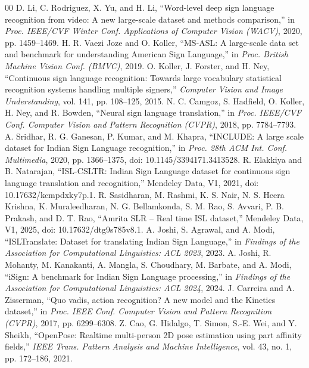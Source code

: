 \documentclass[conference]{IEEEtran}
\begin{document}
\begin{thebibliography}{00}
 D. Li, C. Rodriguez, X. Yu, and H. Li, ``Word-level deep sign language recognition from video: A new large-scale dataset and methods comparison,'' in \textit{Proc. IEEE/CVF Winter Conf. Applications of Computer Vision (WACV)}, 2020, pp. 1459--1469.
 H. R. Vaezi Joze and O. Koller, ``MS-ASL: A large-scale data set and benchmark for understanding American Sign Language,'' in \textit{Proc. British Machine Vision Conf. (BMVC)}, 2019.
 O. Koller, J. Forster, and H. Ney, ``Continuous sign language recognition: Towards large vocabulary statistical recognition systems handling multiple signers,'' \textit{Computer Vision and Image Understanding}, vol. 141, pp. 108--125, 2015.
 N. C. Camgoz, S. Hadfield, O. Koller, H. Ney, and R. Bowden, ``Neural sign language translation,'' in \textit{Proc. IEEE/CVF Conf. Computer Vision and Pattern Recognition (CVPR)}, 2018, pp. 7784--7793.
 A. Sridhar, R. G. Ganesan, P. Kumar, and M. Khapra, ``INCLUDE: A large scale dataset for Indian Sign Language recognition,'' in \textit{Proc. 28th ACM Int. Conf. Multimedia}, 2020, pp. 1366--1375, doi: 10.1145/3394171.3413528.
 R. Elakkiya and B. Natarajan, ``ISL-CSLTR: Indian Sign Language dataset for continuous sign language translation and recognition,'' Mendeley Data, V1, 2021, doi: 10.17632/kcmpdxky7p.1.
 R. Sasidharan, M. Rashmi, K. S. Nair, N. S. Heera Krishna, K. Muraleedharan, N. G. Bellamkonda, S. M. Rao, S. Avvari, P. B. Prakash, and D. T. Rao, ``Amrita SLR -- Real time ISL dataset,'' Mendeley Data, V1, 2025, doi: 10.17632/dtg9s785v8.1.
 A. Joshi, S. Agrawal, and A. Modi, ``ISLTranslate: Dataset for translating Indian Sign Language,'' in \textit{Findings of the Association for Computational Linguistics: ACL 2023}, 2023.
 A. Joshi, R. Mohanty, M. Kanakanti, A. Mangla, S. Choudhary, M. Barbate, and A. Modi, ``iSign: A benchmark for Indian Sign Language processing,'' in \textit{Findings of the Association for Computational Linguistics: ACL 2024}, 2024.
 J. Carreira and A. Zisserman, ``Quo vadis, action recognition? A new model and the Kinetics dataset,'' in \textit{Proc. IEEE Conf. Computer Vision and Pattern Recognition (CVPR)}, 2017, pp. 6299--6308.
 Z. Cao, G. Hidalgo, T. Simon, S.-E. Wei, and Y. Sheikh, ``OpenPose: Realtime multi-person 2D pose estimation using part affinity fields,'' \textit{IEEE Trans. Pattern Analysis and Machine Intelligence}, vol. 43, no. 1, pp. 172--186, 2021.

\end{thebibliography}
\end{document}
